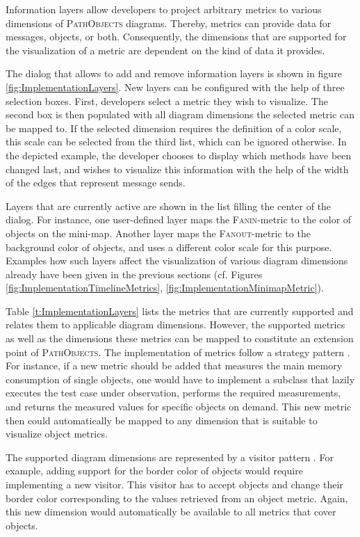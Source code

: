 Information layers allow developers to project arbitrary metrics to various dimensions of \textsc{PathObjects} diagrams.
Thereby, metrics can provide data for messages, objects, or both.
Consequently, the dimensions that are supported for the visualization of a metric are dependent on the kind of data it provides.

The dialog that allows to add and remove information layers is shown in figure \ref{fig:ImplementationLayers}.
New layers can be configured with the help of three selection boxes.
First, developers select a metric they wish to visualize.
The second box is then populated with all diagram dimensions the selected metric can be mapped to.
If the selected dimension requires the definition of a color scale, this scale can be selected from the third list, which can be ignored otherwise.
In the depicted example, the developer chooses to display which methods have been changed last, and wishes to visualize this information with the help of the width of the edges that represent message sends.

Layers that are currently active are shown in the list filling the center of the dialog.
For instance, one user-defined layer maps the \textsc{Fanin}-metric to the color of objects on the mini-map.
Another layer maps the \textsc{Fanout}-metric to the background color of objects, and uses a different color scale for this purpose.
Examples how such layers affect the visualization of various diagram dimensions already have been given in the previous sections (cf. Figures \ref{fig:ImplementationTimelineMetrics}, \ref{fig:ImplementationMinimapMetric}).

Table \ref{t:ImplementationLayers} lists the metrics that are currently supported and relates them to applicable diagram dimensions.
However, the supported metrics as well as the dimensions these metrics can be mapped to constitute an extension point of \textsc{PathObjects}.
The implementation of metrics follow a strategy pattern \cite{gamma_design_1995}.
For instance, if a new metric should be added that measures the main memory consumption of single objects, one would have to implement a subclass that lazily executes the test case under observation, performs the required measurements, and returns the measured values for specific objects on demand.
This new metric then could automatically be mapped to any dimension that is suitable to visualize object metrics.

The supported diagram dimensions are represented by a visitor pattern \cite{gamma_design_1995}.
For example, adding support for the border color of objects would require implementing a new visitor.
This visitor has to accept objects and change their border color corresponding to the values retrieved from an object metric.
Again, this new dimension would automatically be available to all metrics that cover objects.

